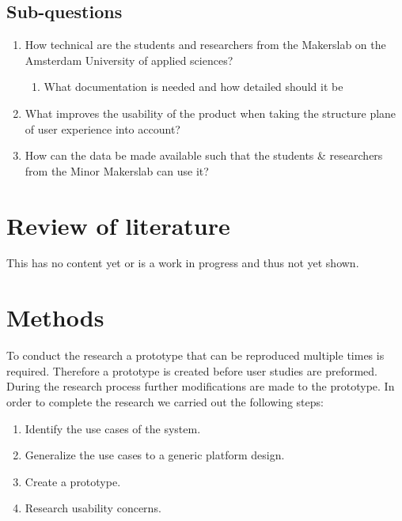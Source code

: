 \documentclass[conference]{IEEEtran}
\begin{document}
\subsection{Sub-questions}
\begin{enumerate}
\item How technical are the students and researchers from the Makerslab on the Amsterdam University of applied sciences?
\begin{enumerate}
\item What documentation is needed and how detailed should it be
\end{enumerate}
\item What improves the usability of the product when taking the structure plane of user experience into account?
\item How can the data be made available such that the students \& researchers from the Minor Makerslab can use it?
\end{enumerate}

\section{Review of literature}
This has no content yet or is a work in progress and thus not yet shown.

\section{Methods}
	To conduct the research a prototype that can be reproduced multiple times is required. Therefore a prototype is created before user studies are preformed. During the research process further modifications are made to the prototype. In order to complete the research we carried out the following steps:
	\begin{enumerate}
		\item Identify the use cases of the system.
		\item Generalize the use cases to a generic platform design.
		\item Create a prototype.
		\item Research usability concerns.
	\end{enumerate}
\end{document}
